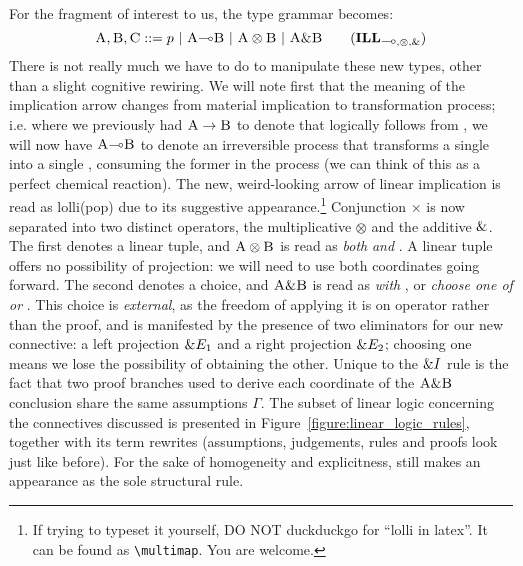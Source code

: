 For the fragment of interest to us, the type grammar becomes:
\begin{equation}
\prop{A}, \prop{B}, \prop{C} ::= p \ | \ \prop{A} \li \prop{B} \ | \ \prop{A} \otimes \prop{B} \ | \ \prop{A} \with \prop{B} 
\tag{$\ILL_{\li, \otimes, \with}$}
\label{grammar:ILL}
\end{equation}
There is not really much we have to do to manipulate these new types, other than a slight cognitive rewiring.
We will note first that the meaning of the implication arrow changes from material implication to transformation process; i.e. where we previously had $\smallprop{A} \to \smallprop{B}$ to denote that  logically follows from , we will now have $\smallprop{A} \li \smallprop{B}$ to denote an irreversible process that transforms a single  into a single , consuming the former in the process (we can think of this as a perfect chemical reaction).
The new, weird-looking arrow of linear implication is read as lolli(pop) due to its suggestive appearance.\footnote{If trying to typeset it yourself, DO NOT duckduckgo for ``lolli in latex''. It can be found as \texttt{\textbackslash multimap}. You are welcome.}
Conjunction $\times$ is now separated into two distinct operators, the multiplicative $\otimes$ and the additive ${\&}$. 
The first denotes a linear tuple, and $\smallprop{A} \otimes \smallprop{B}$ is read as \textit{both}  \textit{and} .
A linear tuple offers no possibility of projection: we will need to use both coordinates going forward.
The second denotes a choice, and $\smallprop{A} \with \smallprop{B}$ is read as  \textit{with} , or \textit{choose one of}  \textit{or} .
This choice is \textit{external}, as the freedom of applying it is on operator rather than the proof, and is manifested by the presence of two eliminators for our new connective: a left projection ${\&} E_1$ and a right projection ${\&} E_2$; choosing one means we lose the possibility of obtaining the other.
Unique to the ${\&} I$ rule is the fact that two proof branches used to derive each coordinate of the $\smallprop{A} \with \smallprop{B}$ conclusion share the same assumptions $\Gamma$.
The subset of linear logic concerning the connectives discussed is presented in Figure~\ref{figure:linear_logic_rules}, together with its term rewrites (assumptions, judgements, rules and proofs look just like before).
For the sake of homogeneity and explicitness, \Exchange{} still makes an appearance as the sole structural rule.

